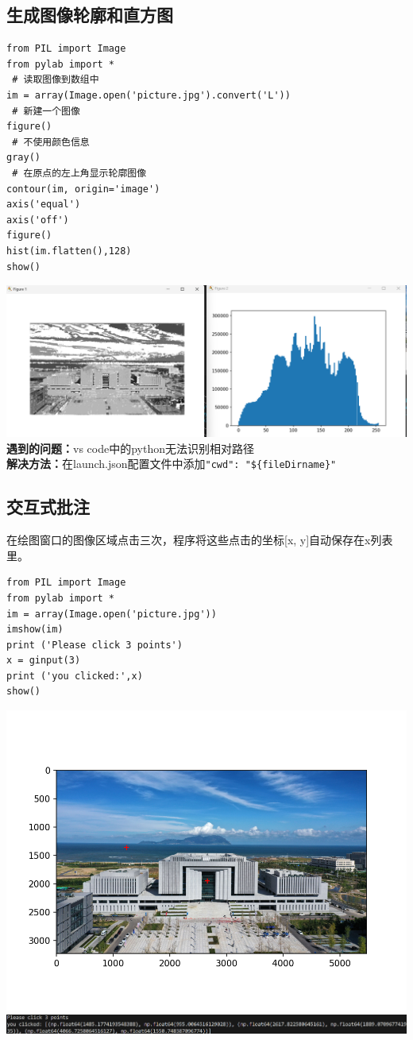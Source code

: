 \documentclass[UTF8,a4paper]{ctexart}
\begin{document}
\subsection{生成图像轮廓和直方图}
\begin{lstlisting}
from PIL import Image
from pylab import *
 # 读取图像到数组中
im = array(Image.open('picture.jpg').convert('L'))
 # 新建一个图像
figure()
 # 不使用颜色信息
gray()
 # 在原点的左上角显示轮廓图像
contour(im, origin='image')
axis('equal')
axis('off')
figure()
hist(im.flatten(),128)
show()
\end{lstlisting}
\includegraphics[width=1\textwidth]{./python/visual2.png}
\textbf{遇到的问题：}vs code中的python无法识别相对路径\\
\textbf{解决方法：}在launch.json配置文件中添加\verb|"cwd": "${fileDirname}"|

\subsection{交互式批注}
在绘图窗口的图像区域点击三次，程序将这些点击的坐标[x, y]自动保存在x列表里。
\begin{lstlisting}
from PIL import Image
from pylab import *
im = array(Image.open('picture.jpg'))
imshow(im)
print ('Please click 3 points')
x = ginput(3)
print ('you clicked:',x)
show()
\end{lstlisting}
\includegraphics[width=1\textwidth]{./python/visual3-1.png}\\
\includegraphics[width=1\textwidth]{./python/visual3-2.png}
\end{document}
